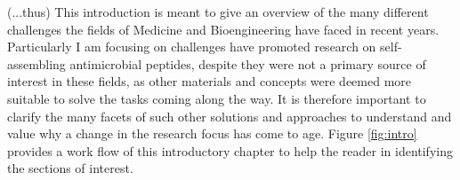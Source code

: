 

\vspace{1cm}
(...thus) This introduction is meant to give an overview of the many different challenges the fields of Medicine and Bioengineering have faced in recent years. Particularly I am focusing on challenges have promoted research on self-assembling antimicrobial peptides, despite they were not a primary source of interest in these fields, as other materials and concepts were deemed more suitable to solve the tasks coming along the way. It is therefore important to clarify the many facets of such other solutions and approaches to understand and value why a change in the research focus has come to age. Figure \ref{fig:intro} provides a work flow of this introductory chapter to help the reader in identifying the sections of interest.

